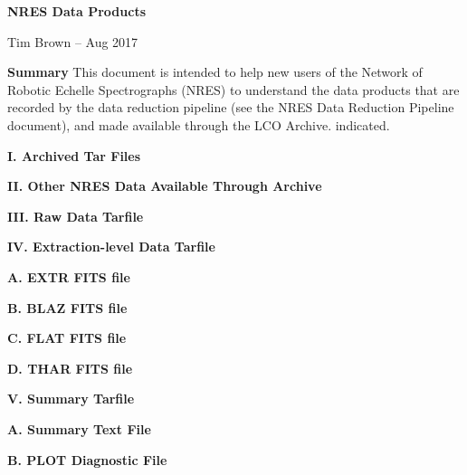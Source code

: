 \null
{}

\centerline{\bf NRES Data Products}
\centerline{Tim Brown --  Aug 2017}
\vskip20pt

\parindent=0pt
{\bf{Summary}}
\vskip8pt
\parindent20pt
This document is intended to help new users of the Network of Robotic Echelle
Spectrographs (NRES) to understand the data products that are recorded by
the data reduction pipeline (see the NRES Data Reduction Pipeline document),
and made available through the LCO Archive.
indicated.

\vskip12pt
\parindent=0pt
{\bf{I. Archived Tar Files}}
\vskip8pt
\parindent20pt

\vskip12pt
\parindent=0pt
{\bf{II. Other NRES Data Available Through Archive}}
\vskip8pt
\parindent20pt

\vskip12pt
\parindent=0pt
{\bf{III. Raw Data Tarfile}}
\vskip8pt
\parindent20pt


\vskip12pt
\parindent=0pt
{\bf{IV. Extraction-level Data Tarfile}}
\vskip8pt
\parindent20pt

\vskip12pt
\parindent=0pt
{\bf{A. EXTR FITS file}}
\vskip8pt
\parindent20pt

\vskip12pt
\parindent=0pt
{\bf{B. BLAZ FITS file}}
\vskip8pt
\parindent20pt

\vskip12pt
\parindent=0pt
{\bf{C. FLAT FITS file}}
\vskip8pt
\parindent20pt

\vskip12pt
\parindent=0pt
{\bf{D. THAR FITS file}}
\vskip8pt
\parindent20pt

\vskip12pt
\parindent=0pt
{\bf{V. Summary Tarfile}}
\vskip8pt
\parindent20pt

\vskip12pt
\parindent=0pt
{\bf{A. Summary Text File}}
\vskip8pt
\parindent20pt

\vskip12pt
\parindent=0pt
{\bf{B. PLOT Diagnostic File}}
\vskip8pt
\parindent20pt

\bye

